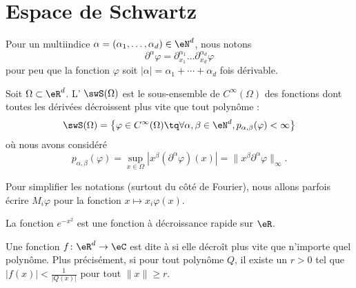 
\section{Espace de Schwartz}

Pour un multiindice \( \alpha=(\alpha_1,\ldots, \alpha_d)\in \eN^d\), nous notons
\begin{equation}
	\partial^{\alpha}\varphi=\partial_{x_1}^{\alpha_1}\ldots\partial_{x_d}^{\alpha_d}\varphi
\end{equation}
pour peu que la fonction \( \varphi\) soit \( | \alpha |=\alpha_1+\cdots +\alpha_d\) fois dérivable.

\begin{definition}  \label{DefHHyQooK}
	Soit \( \Omega\subset\eR^d\). L' \( \swS(\Omega)\) est le sous-ensemble de \(  C^{\infty}(\Omega)\) des fonctions dont toutes les dérivées décroissent plus vite que tout polynôme :
	\begin{equation}
		\swS(\Omega)=\big\{   \varphi\in C^{\infty}(\Omega)\tq\forall \alpha,\beta\in \eN^d, p_{\alpha,\beta}(\varphi)<\infty   \big\}
	\end{equation}
	où nous avons considéré
	\begin{equation}    \label{EqOWdChCu}
		p_{\alpha,\beta}(\varphi)=\sup_{x\in \Omega}| x^{\beta}(\partial^{\alpha}\varphi)(x) |=\| x^{\beta}\partial^{\alpha}\varphi \|_{\infty}.
	\end{equation}
\end{definition}

Pour simplifier les notations (surtout du côté de Fourier), nous allons parfois écrire \( M_i\varphi\) pour la fonction \( x\mapsto x_i\varphi(x)\).

\begin{example}
	La fonction \(  e^{-x^2}\) est une fonction à décroissance rapide sur \( \eR\).
\end{example}

\begin{definition}
	Une fonction \( f\colon \eR^d\to \eC\) est dite à  si elle décroît plus vite que n'importe quel polynôme. Plus précisément, si pour tout polynôme \( Q\), il existe un \( r>0\) tel que \(  | f(x) |<\frac{1}{ | Q(x) | } \) pour tout \( \| x \|\geq r\).
\end{definition}

